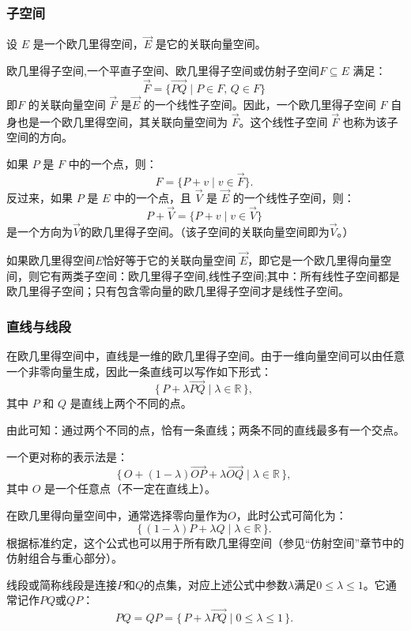 \subsubsection{子空间}
设 $E$ 是一个欧几里得空间，$\overrightarrow{E}$ 是它的关联向量空间。

欧几里得子空间,一个平直子空间、欧几里得子空间或仿射子空间$F \subseteq E$ 满足：
$$
\overrightarrow{F} = \bigl\{ \overrightarrow{PQ} \;\big|\; P \in F,\, Q \in F \bigr\}~
$$
即$F$ 的关联向量空间 $\overrightarrow{F}$ 是$\overrightarrow{E}$ 的一个线性子空间。因此，一个欧几里得子空间 $F$ 自身也是一个欧几里得空间，其关联向量空间为 $\overrightarrow{F}$。这个线性子空间 $\overrightarrow{F}$ 也称为该子空间的方向。

如果 $P$ 是 $F$ 中的一个点，则：
$$
F = 
\bigl\{ P + v \;\big|\; v \in \overrightarrow{F} \bigr\}.~
$$
反过来，如果 $P$ 是 $E$ 中的一个点，且 $\overrightarrow{V}$ 是 $\overrightarrow{E}$ 的一个线性子空间，则：
$$
P + \overrightarrow{V} = 
\bigl\{ P + v \;\big|\; v \in \overrightarrow{V} \bigr\}~
$$
是一个方向为$\overrightarrow{V}$的欧几里得子空间。（该子空间的关联向量空间即为$\overrightarrow{V}$。）

如果欧几里得空间$E$恰好等于它的关联向量空间 $\overrightarrow{E}$，即它是一个欧几里得向量空间，则它有两类子空间：欧几里得子空间,线性子空间;其中：所有线性子空间都是欧几里得子空间；只有包含零向量的欧几里得子空间才是线性子空间。
\subsubsection{直线与线段}
在欧几里得空间中，直线是一维的欧几里得子空间。由于一维向量空间可以由任意一个非零向量生成，因此一条直线可以写作如下形式：
$$
\bigl\{\, P + \lambda \overrightarrow{PQ} \;\big|\; \lambda \in \mathbb{R} \,\bigr\},~
$$
其中 $P$ 和 $Q$ 是直线上两个不同的点。

由此可知：通过两个不同的点，恰有一条直线；两条不同的直线最多有一个交点。

一个更对称的表示法是：
$$
\bigl\{\, O + (1-\lambda)\overrightarrow{OP} + \lambda\overrightarrow{OQ} \;\big|\; \lambda \in \mathbb{R} \,\bigr\},~
$$
其中 $O$ 是一个任意点（不一定在直线上）。

在欧几里得向量空间中，通常选择零向量作为$O$，此时公式可简化为：
$$
\bigl\{\, (1-\lambda)P + \lambda Q \;\big|\; \lambda \in \mathbb{R} \,\bigr\}.~
$$
根据标准约定，这个公式也可以用于所有欧几里得空间（参见“仿射空间”章节中的仿射组合与重心部分）。

线段或简称线段是连接$P$和$Q$的点集，对应上述公式中参数$\lambda$满足$0 \leq \lambda \leq 1$。它通常记作$PQ$或$QP$：
$$
PQ = QP = 
\bigl\{\, P + \lambda \overrightarrow{PQ} \;\big|\; 0 \leq \lambda \leq 1 \,\bigr\}.~
$$
